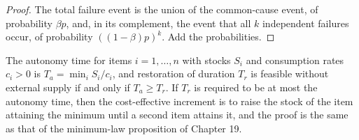 \begin{proof}
The total failure event is the union of the common-cause event, of probability $\beta p$, and, in its complement, the event that all $k$ independent failures occur, of probability $((1-\beta)p)^k$. Add the probabilities.
\end{proof}

The autonomy time for items $i=1,\dots,n$ with stocks $S_i$ and consumption rates $c_i>0$ is $T_a=\min_iS_i/c_i$, and restoration of duration $T_r$ is feasible without external supply if and only if $T_a\ge T_r$. If $T_r$ is required to be at most the autonomy time, then the cost-effective increment is to raise the stock of the item attaining the minimum until a second item attains it, and the proof is the same as that of the minimum-law proposition of Chapter 19.
